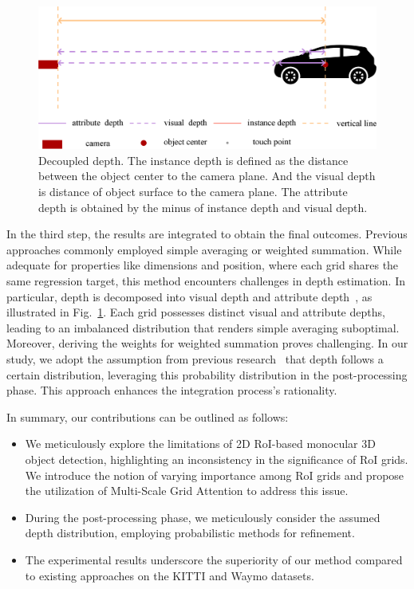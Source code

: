 \documentclass[journal]{IEEEtran}
\begin{document}
	\begin{figure}[!t]
		\centering
		\includegraphics[width=1.0\linewidth]{Figures/decoupled_depth_fig/decoupled_depth.eps}
		\caption{Decoupled depth. The instance depth is defined as the distance between the object center to the camera plane. And the visual depth is distance of object surface to the camera plane. The attribute depth is obtained by the minus of instance depth and visual depth.}
		\label{fig:decoupled depth}
	\end{figure}
	In the third step, the results are integrated to obtain the final outcomes. Previous approaches commonly employed simple averaging or weighted summation. While adequate for properties like dimensions and position, where each grid shares the same regression target, this method encounters challenges in depth estimation. In particular, depth is decomposed into visual depth and attribute depth~\cite{didm3d}, as illustrated in Fig.~\ref{fig:decoupled depth}. Each grid possesses distinct visual and attribute depths, leading to an imbalanced distribution that renders simple averaging suboptimal. Moreover, deriving the weights for weighted summation proves challenging. In our study, we adopt the assumption from previous research~\cite{gupnet, didm3d} that depth follows a certain distribution, leveraging this probability distribution in the post-processing phase. This approach enhances the integration process's rationality.
	
	
	In summary, our contributions can be outlined as follows:
	\begin{itemize}
		\item We meticulously explore the limitations of 2D RoI-based monocular 3D object detection, highlighting an inconsistency in the significance of RoI grids. We introduce the notion of varying importance among RoI grids and propose the utilization of Multi-Scale Grid Attention to address this issue.
		\item During the post-processing phase, we meticulously consider the assumed depth distribution, employing probabilistic methods for refinement.
		\item The experimental results underscore the superiority of our method compared to existing approaches on the KITTI and Waymo datasets.
	\end{itemize}
	
\end{document}
